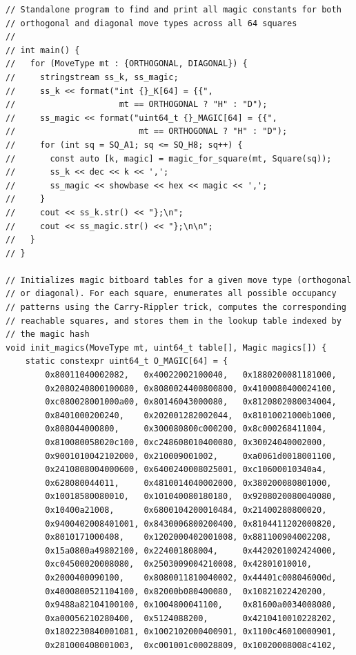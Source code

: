 \documentclass[12pt,a4paper,twoside,openright]{book}
\begin{document}
\begin{mdframed}[skipabove=\baselineskip,topline=false,rightline=false,bottomline=false,leftline=false,linewidth=1pt,linecolor=gray!40,innerleftmargin=8pt]
\begin{verbatim}
// Standalone program to find and print all magic constants for both
// orthogonal and diagonal move types across all 64 squares
//
// int main() {
//   for (MoveType mt : {ORTHOGONAL, DIAGONAL}) {
//     stringstream ss_k, ss_magic;
//     ss_k << format("int {}_K[64] = {{",
//                     mt == ORTHOGONAL ? "H" : "D");
//     ss_magic << format("uint64_t {}_MAGIC[64] = {{",
//                         mt == ORTHOGONAL ? "H" : "D");
//     for (int sq = SQ_A1; sq <= SQ_H8; sq++) {
//       const auto [k, magic] = magic_for_square(mt, Square(sq));
//       ss_k << dec << k << ',';
//       ss_magic << showbase << hex << magic << ',';
//     }
//     cout << ss_k.str() << "};\n";
//     cout << ss_magic.str() << "};\n\n";
//   }
// }

// Initializes magic bitboard tables for a given move type (orthogonal
// or diagonal). For each square, enumerates all possible occupancy
// patterns using the Carry-Rippler trick, computes the corresponding
// reachable squares, and stores them in the lookup table indexed by
// the magic hash
void init_magics(MoveType mt, uint64_t table[], Magic magics[]) {
    static constexpr uint64_t O_MAGIC[64] = {
        0x80011040002082,   0x40022002100040,   0x1880200081181000,
        0x2080240800100080, 0x8080024400800800, 0x4100080400024100,
        0xc080028001000a00, 0x80146043000080,   0x8120802080034004,
        0x8401000200240,    0x202001282002044,  0x81010021000b1000,
        0x808044000800,     0x300080800c000200, 0x8c000268411004,
        0x810080058020c100, 0xc248608010400080, 0x30024040002000,
        0x9001010042102000, 0x210009001002,     0xa0061d0018001100,
        0x2410808004000600, 0x6400240008025001, 0xc10600010340a4,
        0x628080044011,     0x4810014040002000, 0x380200080801000,
        0x10018580080010,   0x101040080180180,  0x9208020080040080,
        0x10400a21008,      0x6800104200010484, 0x21400280800020,
        0x9400402008401001, 0x8430006800200400, 0x8104411202000820,
        0x8010171000408,    0x1202000402001008, 0x881100904002208,
        0x15a0800a49802100, 0x224001808004,     0x4420201002424000,
        0xc04500020008080,  0x2503009004210008, 0x42801010010,
        0x2000400090100,    0x8080011810040002, 0x44401c008046000d,
        0x4000800521104100, 0x82000b080400080,  0x10821022420200,
        0x9488a82104100100, 0x1004800041100,    0x81600a0034008080,
        0xa00056210280400,  0x5124088200,       0x4210410010228202,
        0x1802230840001081, 0x1002102000400901, 0x1100c46010000901,
        0x281000408001003,  0xc001001c00028809, 0x10020008008c4102,

\end{verbatim}
\end{mdframed}
\end{document}
